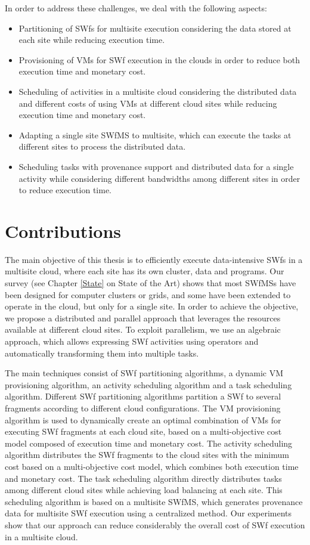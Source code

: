 In order to address these challenges, we deal with the following aspects:
\begin{itemize}
\item Partitioning of SWfs for multisite execution considering the data stored at each site while reducing execution time. 
\item Provisioning of VMs for SWf execution in the clouds in order to reduce both execution time and monetary cost. 
\item Scheduling of activities in a multisite cloud considering the distributed data and different costs of using VMs at different cloud sites while reducing execution time and monetary cost. 
\item Adapting a single site SWfMS to multisite, which can execute the tasks at different sites to process the distributed data.
\item Scheduling tasks with provenance support and distributed data for a single activity while considering different bandwidths among different sites in order to reduce execution time. 
\end{itemize}

\section{Contributions}

The main objective of this thesis is to efficiently execute data-intensive SWfs in a multisite cloud, where each site has its own cluster, data and programs.
Our survey (see Chapter \ref{State} on State of the Art) shows that most SWfMSs have been designed for computer clusters or grids, and some have been extended to operate in the cloud, but only for a single site. 
In order to achieve the objective, we propose a distributed and parallel approach that leverages the resources available at different cloud sites. 
To exploit parallelism, we use an algebraic approach, which allows expressing SWf activities using operators and automatically transforming them into multiple tasks.

The main techniques consist of SWf partitioning algorithms, a dynamic VM provisioning algorithm, an activity scheduling algorithm and a task scheduling algorithm. 
Different SWf partitioning algorithms partition a SWf to several fragments according to different cloud configurations. 
The VM provisioning algorithm is used to dynamically create an optimal combination of VMs for executing SWf fragments at each cloud site, based on a multi-objective cost model composed of execution time and monetary cost.
The activity scheduling algorithm distributes the SWf fragments to the cloud sites with the minimum cost based on a multi-objective cost model, which combines both execution time and monetary cost. 
The task scheduling algorithm directly distributes tasks among different cloud sites while achieving load balancing at each site. 
This scheduling algorithm is based on a multisite SWfMS, which generates provenance data for multisite SWf execution using a centralized method.
Our experiments show that our approach can reduce considerably the overall cost of SWf execution in a multisite cloud.\\

